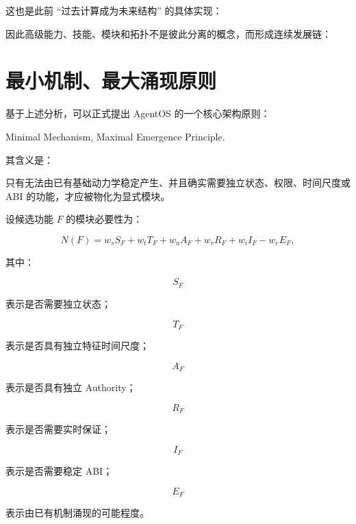 这也是此前 ``过去计算成为未来结构'' 的具体实现：

\begin{statementbox}
\centering
{}
\end{statementbox}

因此高级能力、技能、模块和拓扑不是彼此分离的概念，而形成连续发展链：

\begin{statementbox}
\centering
{}
\end{statementbox}

\section{最小机制、最大涌现原则}

基于上述分析，可以正式提出 AgentOS 的一个核心架构原则：

\begin{statementbox}
Minimal Mechanism, Maximal Emergence Principle.
\end{statementbox}

其含义是：

\begin{statementbox}
只有无法由已有基础动力学稳定产生、并且确实需要独立状态、权限、时间尺度或 ABI 的功能，才应被物化为显式模块。
\end{statementbox}

设候选功能 $F$ 的模块必要性为：

\[
N(F)
=
w_sS_F
+
w_tT_F
+
w_aA_F
+
w_rR_F
+
w_iI_F
-
w_eE_F,
\]

其中：

\[
S_F
\]

表示是否需要独立状态；

\[
T_F
\]

表示是否具有独立特征时间尺度；

\[
A_F
\]

表示是否具有独立 Authority；

\[
R_F
\]

表示是否需要实时保证；

\[
I_F
\]

表示是否需要稳定 ABI；

\[
E_F
\]

表示由已有机制涌现的可能程度。

